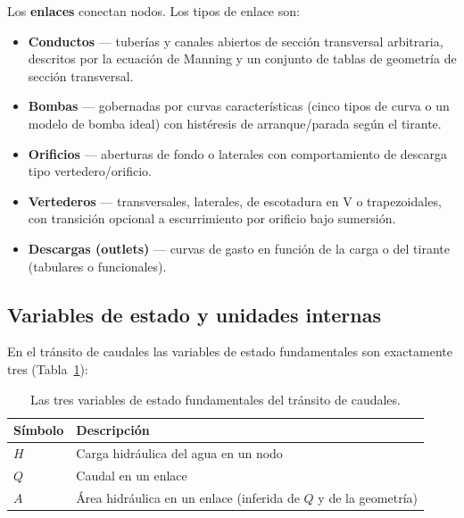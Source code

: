 \documentclass[11pt,a4paper]{article}
\begin{document}
Los \textbf{enlaces} conectan nodos. Los tipos de enlace son:
\begin{itemize}[nosep]
  \item \textbf{Conductos} --- tuberías y canales abiertos de sección
        transversal arbitraria, descritos por la ecuación de Manning y un
        conjunto de tablas de geometría de sección transversal.
  \item \textbf{Bombas} --- gobernadas por curvas características (cinco tipos
        de curva o un modelo de bomba ideal) con histéresis de arranque/parada
        según el tirante.
  \item \textbf{Orificios} --- aberturas de fondo o laterales con
        comportamiento de descarga tipo vertedero/orificio.
  \item \textbf{Vertederos} --- transversales, laterales, de escotadura en V o
        trapezoidales, con transición opcional a escurrimiento por orificio
        bajo sumersión.
  \item \textbf{Descargas (outlets)} --- curvas de gasto en función de la
        carga o del tirante (tabulares o funcionales).
\end{itemize}

\subsection{Variables de estado y unidades internas}

En el tránsito de caudales las variables de estado fundamentales son
exactamente tres (Tabla~\ref{tab:statevars}):

\begin{table}[H]
\centering
\begin{tabular}{ll}
\toprule
\textbf{Símbolo} & \textbf{Descripción} \\
\midrule
$H$  & Carga hidráulica del agua en un nodo \\
$Q$  & Caudal en un enlace \\
$A$  & Área hidráulica en un enlace (inferida de $Q$ y de la geometría) \\
\bottomrule
\end{tabular}
\caption{Las tres variables de estado fundamentales del tránsito de caudales.}
\label{tab:statevars}
\end{table}
\end{document}

